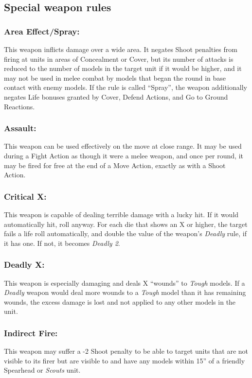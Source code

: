 \begin{multicols}{2}
\section*{Special weapon rules}

\subsubsection*{Area Effect/Spray:} This weapon inflicts damage over a wide area. It negates Shoot penalties from firing at units in areas of Concealment or Cover, but its number of attacks is reduced to the number of models in the target unit if it would be higher, and it may not be used in melee combat by models that began the round in base contact with enemy models. If the rule is called ``Spray'', the weapon additionally negates Life bonuses granted by Cover, Defend Actions, and Go to Ground Reactions.

\subsubsection*{Assault:} This weapon can be used effectively on the move at close range. It may be used during a Fight Action as though it were a melee weapon, and once per round, it may be fired for free at the end of a Move Action, exactly as with a Shoot Action.

\subsubsection*{Critical X:} This weapon is capable of dealing terrible damage with a lucky hit. If it would automatically hit, roll anyway. For each die that shows an X or higher, the target fails a life roll automatically, and double the value of the weapon's \textit{Deadly} rule, if it has one. If not, it becomes \textit{Deadly 2}.

\subsubsection*{Deadly X:} This weapon is especially damaging and deals X ``wounds'' to \textit{Tough} models. If a \textit{Deadly} weapon would deal more wounds to a \textit{Tough} model than it has remaining wounds, the excess damage is lost and not applied to any other models in the unit.

\subsubsection*{Indirect Fire:} This weapon may suffer a -2 Shoot penalty to be able to target units that are not visible to its firer but are visible to and have any models within 15'' of a friendly Spearhead or \textit{Scouts} unit.


\end{multicols}
